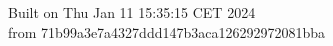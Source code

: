 {\noindent Built on Thu Jan 11 15:35:15 CET 2024} \\ 
 {\noindent from 71b99a3e7a4327ddd147b3aca126292972081bba}
